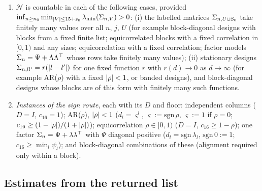 \begin{supplem}
\begin{enumerate}[label=(\arabic*),leftmargin=2em,itemsep=1pt]
  \item $\mathcal N$ is countable in each of the following cases, provided $\inf_{n\ge n_0}\min_{\lvert V\rvert\le15+s_0}\lambda_{\min}(\Sigma_{n,V})>0$:
    (i) the labelled matrices $\Sigma_{n,U\cup S_0}$ take finitely many values over all $n$, $j$, $U$ (for example
    block-diagonal designs with blocks from a fixed finite list; equicorrelated blocks with a fixed correlation in $[0,1)$
    and any sizes; equicorrelation with a fixed correlation; factor models $\Sigma_n=\Psi+\Lambda\Lambda^\top$ whose rows take
    finitely many values); (ii) stationary designs $\Sigma_{n,ll'}=r(\lvert l-l'\rvert)$ for one fixed function $r$ with
    $r(d)\to0$ as $d\to\infty$ (for example AR($\rho$) with a fixed $\lvert \rho\rvert<1$, or banded designs), and block-diagonal
    designs whose blocks are of this form with finitely many such functions.
  \item \emph{Instances of the sign route}, each with its $D$ and floor: independent columns ($D=I$, $c_{16}=1$); AR($\rho$),
    $\lvert \rho\rvert<1$ ($d_l=\varsigma^l$, $\varsigma:=\mathrm{sgn}\,\rho$, $\varsigma:=1$ if $\rho=0$; $c_{16}\ge(1-\lvert \rho\rvert)/(1+\lvert \rho\rvert)$);
    equicorrelation $\rho\in[0,1)$ ($D=I$, $c_{16}\ge1-\rho$); one factor $\Sigma_n=\Psi+\lambda\lambda^\top$ with $\Psi$ diagonal
    positive ($d_l=\mathrm{sgn}\,\lambda_l$, $\mathrm{sgn}\,0:=1$; $c_{16}\ge\min_l\psi_l$); and block-diagonal combinations of
    these (alignment required only within a block).
\end{enumerate}
\end{supplem}


\subsection{Estimates from the returned list}\label{sec:supp-list}

